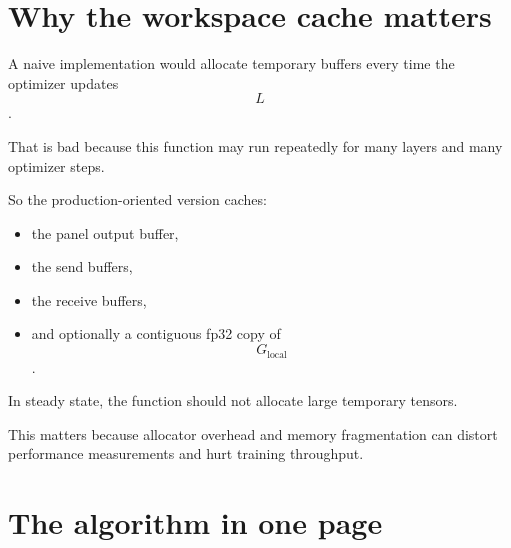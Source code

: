 \documentclass[11pt]{article}
\begin{document}
\section{Why the workspace cache matters}

A naive implementation would allocate temporary buffers every time the optimizer updates $$L$$.

That is bad because this function may run repeatedly for many layers and many optimizer steps.

So the production-oriented version caches:

\begin{itemize}[leftmargin=1.5em]
    \item the panel output buffer,
    \item the send buffers,
    \item the receive buffers,
    \item and optionally a contiguous fp32 copy of $$G_{\text{local}}$$.
\end{itemize}

In steady state, the function should not allocate large temporary tensors.

This matters because allocator overhead and memory fragmentation can distort performance measurements and hurt training throughput.

\section{The algorithm in one page}
\end{document}

